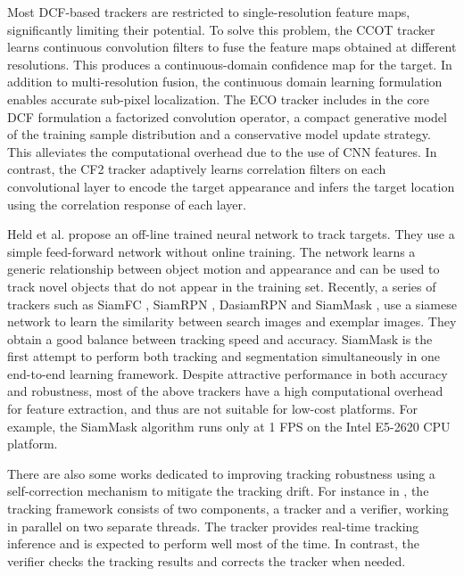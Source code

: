 \documentclass[review]{elsarticle}
\begin{document}
\begin{CJK*}{UTF8}{gbsn}
Most DCF-based trackers are restricted to single-resolution feature maps, significantly limiting their potential. To solve this problem, the CCOT tracker \cite{Danelljan2016BeyondCF} learns continuous convolution filters to fuse the feature maps obtained at different resolutions. This produces a continuous-domain confidence map for the target. In addition to multi-resolution fusion, the continuous domain learning formulation enables accurate sub-pixel localization.
The ECO tracker \cite{Danelljan2016ECOEC} includes in the core DCF formulation a factorized convolution operator, a compact generative model of the training sample distribution and a conservative model update strategy. This alleviates the computational overhead due to the use of CNN features. In contrast, the CF2 tracker \cite{Ma2015HierarchicalCF} adaptively learns correlation filters on each convolutional layer to encode the target appearance and infers the target location using the correlation response of each layer.

Held et al. \cite{held2016learning} propose an off-line trained neural network to track targets. They use a simple feed-forward network without online training. The network learns a generic relationship between object motion and appearance and can be used to track novel objects that do not appear in the training set. 
Recently, a series of trackers such as SiamFC \cite{bertinetto2016fully}, SiamRPN \cite{Li2018HighPV}, DasiamRPN \cite{zhu2018distractor} and SiamMask \cite{Wang2018SiamMask}, use a siamese network to learn the similarity between search images and exemplar images. They obtain a good balance between tracking speed and accuracy. SiamMask is the first attempt to perform both tracking and segmentation simultaneously in one end-to-end learning framework.
Despite attractive performance in both accuracy and robustness, most of the above trackers have a high computational overhead for feature extraction, and thus are not suitable for low-cost platforms. For example, the SiamMask algorithm runs only at 1 FPS on the Intel E5-2620 CPU platform.

There are also some works dedicated to improving tracking robustness using a self-correction mechanism to mitigate the tracking drift. For instance in \cite{fan2017parallel}, the tracking framework consists of two components, a tracker and a verifier, working in parallel on two separate threads. The tracker provides real-time tracking inference and is expected to perform well most of the time. In contrast, the verifier checks the tracking results and corrects the tracker when needed.


\end{CJK*}
\end{document}
